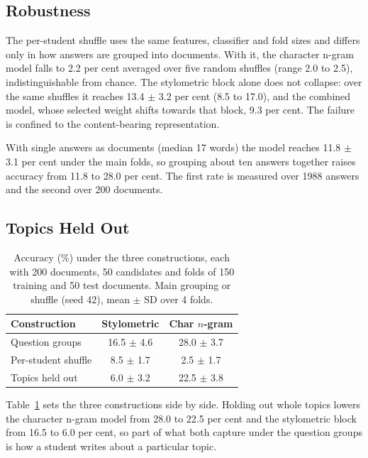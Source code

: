 \documentclass[conference]{IEEEtran}
\begin{document}
\subsection{Robustness}

The per-student shuffle uses the same features, classifier and fold sizes and differs only in how answers are grouped into documents. With it, the character n-gram model falls to 2.2 per cent averaged over five random shuffles (range 2.0 to 2.5), indistinguishable from chance. The stylometric block alone does not collapse: over the same shuffles it reaches 13.4 $\pm$ 3.2 per cent (8.5 to 17.0), and the combined model, whose selected weight shifts towards that block, 9.3 per cent. The failure is confined to the content-bearing representation.

With single answers as documents (median 17 words) the model reaches 11.8 $\pm$ 3.1 per cent under the main folds, so grouping about ten answers together raises accuracy from 11.8 to 28.0 per cent. The first rate is measured over 1988 answers and the second over 200 documents.

\subsection{Topics Held Out}

\begin{table}[!t]
\caption{Accuracy (\%) under the three constructions, each with 200 documents, 50 candidates and folds of 150 training and 50 test documents. Main grouping or shuffle (seed 42), mean $\pm$ SD over 4 folds.}
\label{tab:conditions}
\centering
\footnotesize
\setlength{\tabcolsep}{3pt}
\begin{tabular}{@{}lcc@{}}
\hline
Construction & Stylometric & Char $n$-gram \\
\hline
Question groups      & 16.5 $\pm$ 4.6 & 28.0 $\pm$ 3.7 \\
Per-student shuffle  & 8.5 $\pm$ 1.7  & 2.5 $\pm$ 1.7  \\
Topics held out      & 6.0 $\pm$ 3.2  & 22.5 $\pm$ 3.8 \\
\hline
\end{tabular}
\end{table}

Table~\ref{tab:conditions} sets the three constructions side by side. Holding out whole topics lowers the character n-gram model from 28.0 to 22.5 per cent and the stylometric block from 16.5 to 6.0 per cent, so part of what both capture under the question groups is how a student writes about a particular topic.
\end{document}
